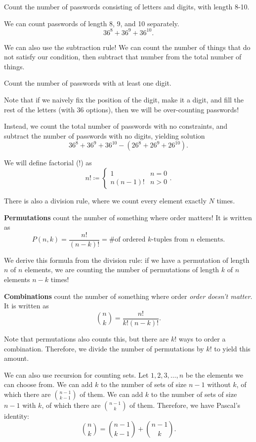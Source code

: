 \begin{eg}
	Count the number of passwords consisting of letters and digits, with length 8-10.
\end{eg}

We can count passwords of length 8, 9, and 10 separately. \[
	36^8+36^9+36^{10}
.\] 

We can also use the subtraction rule! We can count the number of things that do not satisfy our condition, then subtract that number from the total number of things.

\begin{eg}
	Count the number of passwords with at least one digit.
\end{eg}
Note that if we naively fix the position of the digit, make it a digit, and fill the rest of the letters (with 36 options), then we will be over-counting passwords!

Instead, we count the total number of passwords with no constraints, and subtract the number of passwords with no digits, yielding solution \[
	36^8+36^9+36^{10} - (26^8+26^9+26^{10})
.\] 

\begin{notation}
	We will define factorial (!) as \[
		n! \coloneq \begin{cases}
			1 & n=0\\
			n(n-1)! & n>0
		\end{cases}
	.\]
\end{notation}

There is also a division rule, where we count every element exactly \( N \) times.

\begin{definition}
	\textbf{Permutations} count the number of something where order matters! It is written as \[
		P(n,k)=\frac{n!}{(n-k)!}= \text{\# of ordered }k\text{-tuples from } n \text{ elements}
	.\] 
\end{definition}

We derive this formula from the division rule: if we have a permutation of length \( n \) of \( n \) elements, we are counting the number of permutations of length \( k \) of \( n \) elements \( n-k \) times!

\begin{definition}
	\textbf{Combinations} count the number of something where order \textit{order doesn't matter}. It is written as \[
		\binom{n}{k} = \frac{n!}{k!(n-k)!}
	.\] 
\end{definition}

Note that permutations also counts this, but there are \( k! \) ways to order a combination. Therefore, we divide the number of permutations by \( k! \) to yield this amount.

We can also use recursion for counting sets. Let \( 1,2,3,\ldots ,n \) be the elements we can choose from. We can add \( k \) to the number of sets of size \( n-1 \) without \( k \), of which there are \( \binom{n-1}{k-1} \) of them. We can add \( k \) to the number of sets of size \( n-1  \) with \( k \), of which there are \( \binom{n-1}{k} \) of them. Therefore, we have Pascal's identity: \[
	\binom{n}{k}=\binom{n-1}{k-1}+\binom{n-1}{k}
.\]
